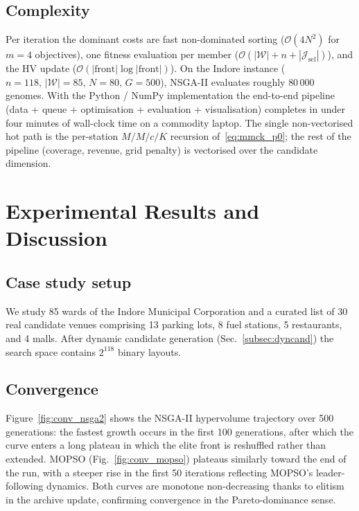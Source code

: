 \documentclass[conference]{IEEEtran}
\begin{document}
\subsection{Complexity}
\label{subsec:complexity}
Per iteration the dominant costs are fast non-dominated sorting
($\mathcal{O}(4N^{2})$ for $m{=}4$ objectives), one fitness
evaluation per member
($\mathcal{O}(|\mathcal{W}|\!+\!n\!+\!|\mathcal{J}_{\text{sel}}|)$),
and the HV update
($\mathcal{O}(|\text{front}|\log|\text{front}|)$). On the Indore
instance ($n{=}118,\,|\mathcal{W}|{=}85,\,N{=}80,\,G{=}500$),
NSGA-II evaluates roughly $80\,000$ genomes. With the Python /
NumPy implementation the end-to-end pipeline (data + queue +
optimisation + evaluation + visualisation) completes in under four
minutes of wall-clock time on a commodity laptop. The single
non-vectorised hot path is the per-station $M/M/c/K$ recursion
of~\eqref{eq:mmck_p0}; the rest of the pipeline (coverage,
revenue, grid penalty) is vectorised over the candidate dimension.

\section{Experimental Results and Discussion}
\label{sec:results}

\subsection{Case study setup}
We study 85 wards of the Indore Municipal Corporation and a curated
list of 30 real candidate venues comprising 13 parking lots, 8 fuel
stations, 5 restaurants, and 4 malls. After dynamic candidate generation
(Sec.~\ref{subsec:dyncand}) the search space contains $2^{118}$ binary
layouts.

\subsection{Convergence}
\label{subsec:conv}
Figure~\ref{fig:conv_nsga2} shows the NSGA-II hypervolume
trajectory over 500 generations: the fastest growth occurs in the
first 100 generations, after which the curve enters a long plateau
in which the elite front is reshuffled rather than extended.
MOPSO (Fig.~\ref{fig:conv_mopso}) plateaus similarly toward the
end of the run, with a steeper rise in the first 50 iterations
reflecting MOPSO's leader-following dynamics. Both curves are
monotone non-decreasing thanks to elitism in the archive update,
confirming convergence in the Pareto-dominance sense.
\end{document}
